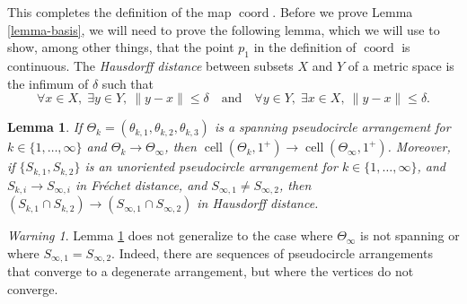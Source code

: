 \documentclass[11pt]{article}
\numberwithin{equation}{section}
\newcommand{\quand}{\quad\text{and}\quad}
\newtheorem{lemma}[theorem]{Lemma}
\theoremstyle{remark}
\newtheorem{warning}[theorem]{Warning}
\let\df\emph
\DeclareMathOperator{\cell}{cell}
\DeclareMathOperator{\coord}{coord}
\begin{document}
This completes the definition of the map $\coord$. Before we prove Lemma \ref{lemma-basis}, we will need to prove the following lemma, which we will use to show, among other things, that the point $p_1$ in the definition of $\coord$ is continuous.
The \df{Hausdorff distance} between subsets $X$ and $Y$ of a metric space is the infimum of $\delta$ such that
\[
\forall x \in X,\; \exists y \in Y,\ \|y-x\| \leq \delta \quand\forall y \in Y,\; \exists x \in X,\ \|y-x\| \leq \delta .
\]

\begin{lemma}\label{lemma-vertex}
If $\Theta_k = (\theta_{k,1},\theta_{k,2},\theta_{k,3})$ is a spanning pseudocircle arrangement for $k\in \{1,\dots,\infty\}$ and $\Theta_k \to \Theta_\infty$, then $\cell(\Theta_k,1^+) \to \cell(\Theta_\infty,1^+)$.
Moreover, if $\{S_{k,1}, S_{k,2}\}$ is an unoriented pseudocircle arrangement for $k\in \{1,\dots,\infty\}$, and $S_{k,i} \to S_{\infty,i}$ in Fréchet distance, and $S_{\infty,1}\neq S_{\infty,2}$, then $(S_{k,1}\cap S_{k,2}) \to (S_{\infty,1}\cap S_{\infty,2})$ in Hausdorff distance.
\end{lemma}

\begin{warning}
Lemma \ref{lemma-vertex} does not generalize to the case where $\Theta_\infty$ is not spanning or where $S_{\infty,1} = S_{\infty,2}$.
Indeed, there are sequences of pseudocircle arrangements that converge to a degenerate arrangement, but where the vertices do not converge.
\end{warning}
\end{document}
